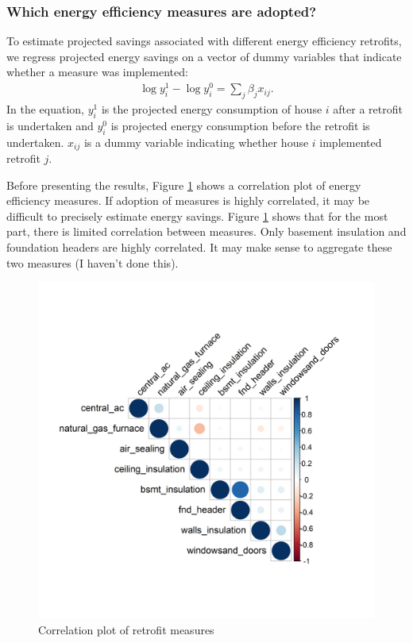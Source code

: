 \documentclass{article}
\begin{document}
\subsubsection{Which energy efficiency measures are adopted?}
To estimate projected savings associated with different energy efficiency retrofits, we regress projected energy savings on a vector of dummy variables that indicate whether a measure was implemented:
\begin{align}
	\log y^1_i - \log y^0_i = \sum_j \beta_j x_{ij}.
\end{align}
In the equation, $y^1_i$ is the projected energy consumption of house $i$ after a retrofit is undertaken and $y^0_i$ is projected energy consumption before the retrofit is undertaken. $x_{ij}$ is a dummy variable indicating whether house $i$ implemented retrofit $j$.

Before presenting the results, Figure \ref{fig_corplot} shows a correlation plot of energy efficiency measures. If adoption of measures is highly correlated, it may be difficult to precisely estimate energy savings.  Figure \ref{fig_corplot} shows that for the most part, there is limited correlation between measures.  Only basement insulation and foundation headers are highly correlated.  It may make sense to aggregate these two measures (I haven't done this).

\begin{figure}
	\includegraphics{"../output_figures_tables/correlation_plot.png"}
	\caption{Correlation plot of retrofit measures}\label{fig_corplot}
\end{figure}
\end{document}
